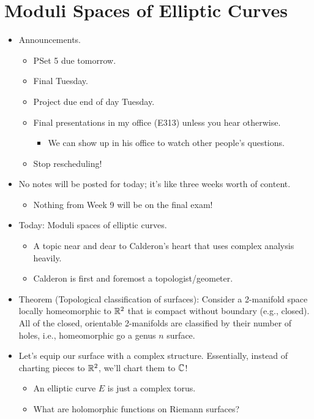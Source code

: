 \documentclass[../notes.tex]{subfiles}
\begin{document}
\section{Moduli Spaces of Elliptic Curves}
\begin{itemize}
    \item {}Announcements.
    \begin{itemize}
        \item PSet 5 due tomorrow.
        \item Final Tuesday.
        \item Project due end of day Tuesday.
        \item Final presentations in my office (E313) unless you hear otherwise.
        \begin{itemize}
            \item We can show up in his office to watch other people's questions.
        \end{itemize}
        \item Stop rescheduling!
    \end{itemize}
    \item No notes will be posted for today; it's like three weeks worth of content.
    \begin{itemize}
        \item Nothing from Week 9 will be on the final exam!
    \end{itemize}
    \item Today: Moduli spaces of elliptic curves.
    \begin{itemize}
        \item A topic near and dear to Calderon's heart that uses complex analysis heavily.
        \item Calderon is first and foremost a topologist/geometer.
    \end{itemize}
    \item Theorem (Topological classification of surfaces): Consider a 2-manifold space locally homeomorphic to $\mathbb{R}^2$ that is compact without boundary (e.g., closed). All of the closed, orientable 2-manifolds are classified by their number of holes, i.e., homeomorphic go a genus $n$ surface.
    \item Let's equip our surface with a complex structure. Essentially, instead of charting pieces to $\mathbb{R}^2$, we'll chart them to $\mathbb{C}$!
    \begin{itemize}
        \item An elliptic curve $E$ is just a complex torus.
        \item What are holomorphic functions on Riemann surfaces?

\end{itemize}
\end{itemize}
\end{document}
